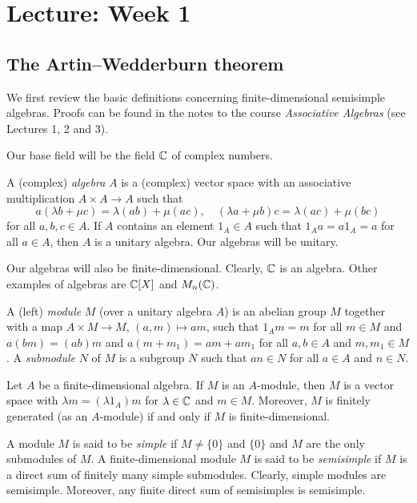 \section{Lecture: Week 1}

\subsection{The Artin--Wedderburn theorem}

We first review the basic definitions concerning
finite-dimensional semisimple algebras. 
Proofs can be found in the
notes to the course \emph{Associative Algebras} (see
Lectures 1, 2 and 3). 

Our base field will be the field $\mathbb{C}$ of complex numbers. 

A (complex) \emph{algebra} $A$ is a (complex) vector space  
with an associative multiplication $A\times A\to A$ such that
\[
a(\lambda b+\mu c)=\lambda(ab)+\mu(ac),
\quad
(\lambda a+\mu b)c=\lambda(ac)+\mu (bc)
\]
for all $a,b,c\in A$. If $A$ contains 
an element $1_A\in A$ such that $1_Aa=a1_A=a$ for all $a\in A$, then $A$ is 
a unitary algebra. Our algebras will be unitary. 

Our algebras will also be finite-dimensional. 
Clearly, $\mathbb{C}$ is an algebra. Other 
examples of algebras are $\mathbb{C}[X]$ and $M_n(\mathbb{C})$. 

A (left) \emph{module} $M$ (over a unitary 
algebra $A$) is an abelian group $M$
together with a map $A\times M\to M$, $(a,m)\mapsto am$, such that
$1_Am=m$ for all $m\in M$ and 
$a(bm)=(ab)m$ and $a(m+m_1)=am+am_1$ for all $a,b\in A$ and $m,m_1\in M$. 
A \emph{submodule} $N$ of $M$ is a subgroup 
$N$ such that $an\in N$ for all $a\in A$ and $n\in N$. 

\begin{exercise}
Let $A$ be a finite-dimensional algebra. If $M$ 
is an $A$-module, then $M$ is a vector space with 
$\lambda m=(\lambda 1_A)m$ for $\lambda\in\mathbb{C}$ and $m\in M$. Moreover, 
$M$ is finitely generated (as an $A$-module) if and only if $M$ is finite-dimensional. 
\end{exercise}

A module $M$ is said to be \emph{simple} if $M\ne\{0\}$ and $\{0\}$ and $M$ 
are the only submodules of $M$.	
A finite-dimensional module $M$  
is said to be \emph{semisimple} if $M$ is a direct sum of 
finitely many simple submodules. 
Clearly, simple modules are semisimple. Moreover, any finite direct sum of semisimples is semisimple. 


